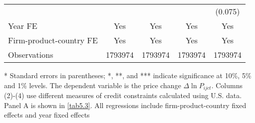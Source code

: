 \begin{table}[htbp]
\begin{threeparttable}
\begin{tabular}{lcccc}
			&       &       &       & (0.075) \\
			Year FE  & Yes   & Yes   & Yes   & Yes \\
			Firm-product-country FE & Yes   & Yes   & Yes   & Yes \\
			Observations & 1793974 & 1793974 & 1793974 & 1793974 \\
			\bottomrule
		\end{tabular}
		\begin{tablenotes}
			\footnotesize
			\item[*] Standard errors in parentheses; *, **, and *** indicate significance at 10\%, 5\% and 1\% levels. The dependent variable is the price change $\Delta \ln P_{ijct}$. Columns (2)-(4) use different measures of credit constraints calculated using U.S. data. Panel A is shown in \ref{tab5.3}. All regressions include firm-product-country fixed effects and year fixed effects
		\end{tablenotes}
	\end{threeparttable}
	\label{tabA.1}
\end{table}

